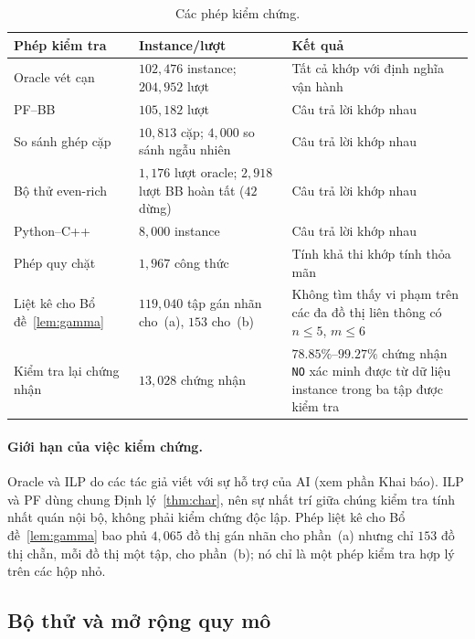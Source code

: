 \documentclass[pdflatex,sn-mathphys-num]{sn-jnl}
\theoremstyle{thmstyleone}
\theoremstyle{thmstyletwo}
\theoremstyle{thmstylethree}
\newcommand{\NO}{\texttt{NO}}
\begin{document}
\begin{table}[!t]
\caption{Các phép kiểm chứng.}
\label{tab:validation}
\footnotesize
\begin{tabular*}{\textwidth}{@{\extracolsep\fill}p{}p{}p{}}
\toprule
Phép kiểm tra & Instance/lượt & Kết quả \\
\midrule
Oracle vét cạn & $102{,}476$ instance; $204{,}952$ lượt & Tất cả khớp với định nghĩa vận hành \\
PF--BB & $105{,}182$ lượt & Câu trả lời khớp nhau \\
So sánh ghép cặp & $10{,}813$ cặp; $4{,}000$ so sánh ngẫu nhiên & Câu trả lời khớp nhau \\
Bộ thử even-rich & $1{,}176$ lượt oracle; $2{,}918$ lượt BB hoàn tất ($42$ dừng) & Câu trả lời khớp nhau \\
Python--C++ & $8{,}000$ instance & Câu trả lời khớp nhau \\
Phép quy chặt & $1{,}967$ công thức & Tính khả thi khớp tính thỏa mãn \\
Liệt kê cho Bổ đề~\ref{lem:gamma} & $119{,}040$ tập gán nhãn cho~(a), $153$ cho~(b) & Không tìm thấy vi phạm trên các đa đồ thị liên thông có $n\le5$, $m\le6$ \\
Kiểm tra lại chứng nhận & $13{,}028$ chứng nhận & $78.85\%$--$99.27\%$ chứng nhận \NO{} xác minh được từ dữ liệu instance trong ba tập được kiểm tra \\
\bottomrule
\end{tabular*}
\end{table}

\paragraph{Giới hạn của việc kiểm chứng.} Oracle và ILP do các tác giả viết với sự hỗ trợ của AI (xem phần Khai báo). ILP và PF dùng chung Định lý~\ref{thm:char}, nên sự nhất trí giữa chúng kiểm tra tính nhất quán nội bộ, không phải kiểm chứng độc lập. Phép liệt kê cho Bổ đề~\ref{lem:gamma} bao phủ $4{,}065$ đồ thị gán nhãn cho phần~(a) nhưng chỉ $153$ đồ thị chẵn, mỗi đồ thị một tập, cho phần~(b); nó chỉ là một phép kiểm tra hợp lý trên các hộp nhỏ.

\subsection{Bộ thử và mở rộng quy mô}\label{sec:scope}
\end{document}
